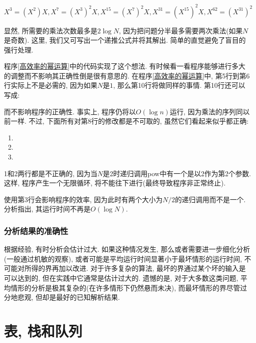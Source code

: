 \documentclass[oneside]{ctexbook}
\begin{document}
\begin{equation*}
    X^3=(X^2)X, X^7=(X^3)^2X, X^{15}=(X^7)^2X, X^{31}=(X^{15})^2X, X^{62}=(X^{31})^2
\end{equation*}

显然, 所需要的乘法次数最多是$2\log{N}$, 因为把问题分半最多需要两次乘法(如果$N$是奇数). 这里, 我们又可写出一个递推公式并将其解出. 简单的直觉避免了盲目的强行处理.

程序\ref{高效率的幂运算}中的代码实现了这个想法. 有时候看一看程序能够进行多大的调整而不影响其正确性倒是很有意思的. 在程序\ref{高效率的幂运算}中, 第5行到第6行实际上不是必需的, 因为如果$N$是$1$, 那么第10行将做同样的事情. 第10行还可以写成:


而不影响程序的正确性. 事实上, 程序仍将以$O(\log{n})$运行, 因为乘法的序列同以前一样. 不过, 下面所有对第8行的修改都是不可取的, 虽然它们看起来似乎都正确:

\begin{enumerate}
    \item {}
    \item {}
    \item {}
\end{enumerate}

1和2两行都是不正确的, 因为当$N$是2时递归调用pow中有一个是以2作为第2个参数. 这样, 程序产生一个无限循环, 将不能往下进行(最终导致程序非正常终止).

使用第3行会影响程序的效率, 因为此时有两个大小为$N/2$的递归调用而不是一个. 分析指出, 其运行时间不再是$O(\log{N})$.

\subsection{分析结果的准确性}

根据经验, 有时分析会估计过大. 如果这种情况发生, 那么或者需要进一步细化分析(一般通过机敏的观察), 或者可能是平均运行时间显著小于最坏情形的运行时间, 不可能对所得的界再加以改进. 对于许多复杂的算法, 最坏的界通过某个坏的输入是可以达到的, 但在实践中它通常是估计过大的. 遗憾的是, 对于大多数这类问题, 平均情形的分析是极其复杂的(在许多情形下仍然悬而未决), 而最坏情形的界尽管过分地悲观, 但却是最好的已知解析结果.

\chapter{表, 栈和队列}
\end{document}
